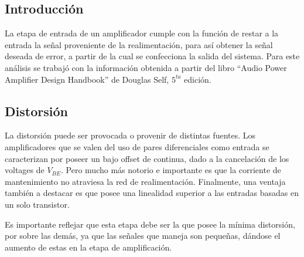 \subsection{Introducción}

La etapa de entrada de un amplificador cumple con la función de restar a la entrada la señal proveniente de la realimentación, para así obtener la señal deseada de error, a partir de la cual se confecciona la salida del sistema. Para este análisis se trabajó con la información obtenida a partir del libro ``Audio Power Amplifier Design Handbook'' de Douglas Self, $5^{ta}$ edición.

\subsection{Distorsión}

La distorsión puede ser provocada o provenir de distintas fuentes. Los amplificadores que se valen del uso de pares diferenciales como entrada se caracterizan por poseer un bajo offset de continua, dado a la cancelación de los voltages de $V_{BE}$. Pero mucho más notorio e importante es que la corriente de mantenimiento no atraviesa la red de realimentación. Finalmente, una ventaja también a destacar es que posee una linealidad superior a las entradas basadas en un solo transistor. %

Es importante reflejar que esta etapa debe ser la que posee la mínima distorsión, por sobre las demás, ya que las señales que maneja son pequeñas, dándose el aumento de estas en la etapa de amplificación.    

